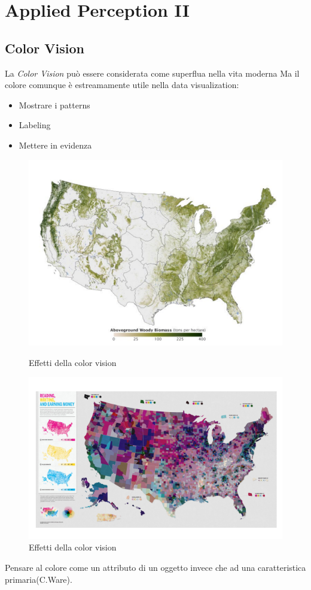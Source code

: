\section{Applied Perception II }
\subsection{Color Vision}
La \textit{Color Vision} può essere considerata come superflua nella vita moderna
Ma il colore comunque è estreamamente utile nella data visualization:
\begin{itemize}
    \item Mostrare i patterns
    \item Labeling
    \item Mettere in evidenza
\end{itemize}
\begin{figure}[H]
    \centering
    \begin{minipage}{0.45\textwidth}
        \centering
        \includegraphics[width=\linewidth]{images/ColorVision.png} 
        \caption{Effetti della color vision}
        \label{fig:immagine1}
    \end{minipage}\hfill
    \begin{minipage}{0.45\textwidth}
        \centering
        \includegraphics[width=\linewidth]{images/ColorVision2.png} 
        \caption{Effetti della color vision}
        \label{fig:immagine2}
    \end{minipage}
\end{figure}
Pensare al colore come un attributo di un oggetto invece che ad una caratteristica primaria(C.Ware).
